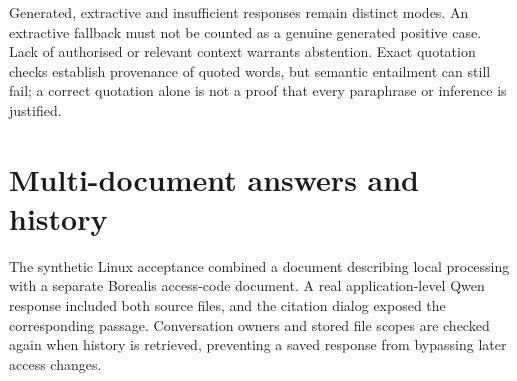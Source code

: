 Generated, extractive and insufficient responses remain distinct modes. An extractive fallback must not be counted as a genuine generated positive case. Lack of authorised or relevant context warrants abstention. Exact quotation checks establish provenance of quoted words, but semantic entailment can still fail; a correct quotation alone is not a proof that every paraphrase or inference is justified.
\section{Multi-document answers and history}
The synthetic Linux acceptance combined a document describing local processing with a separate Borealis access-code document. A real application-level Qwen response included both source files, and the citation dialog exposed the corresponding passage. Conversation owners and stored file scopes are checked again when history is retrieved, preventing a saved response from bypassing later access changes.
\FloatBarrier

